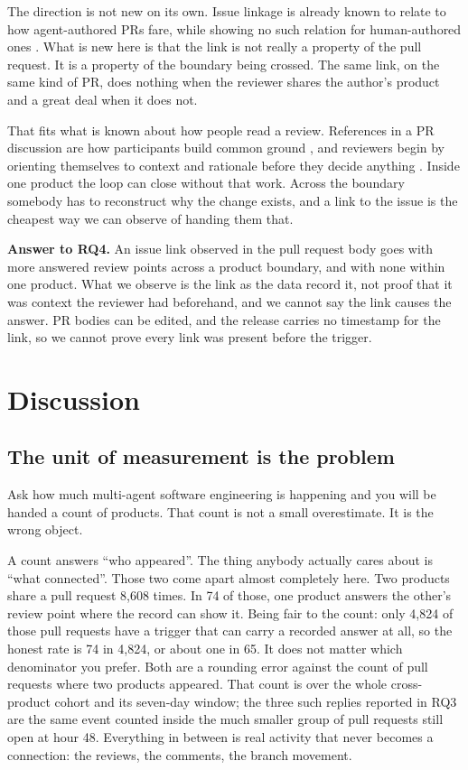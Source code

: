\documentclass[lineno,pdflatex,sn-basic]{sn-jnl}
\begin{document}
The direction is not new on its own. Issue linkage is already known to relate to
how agent-authored PRs fare, while showing no such relation for human-authored
ones \citep{yoshioka2026meaningful}. What is new here is that the link is not
really a property of the pull request. It is a property of the boundary being
crossed. The same link, on the same kind of PR, does nothing when the reviewer
shares the author's product and a great deal when it does not.

That fits what is known about how people read a review. References in a PR
discussion are how participants build common ground \citep{chopra2021referencing},
and reviewers begin by orienting themselves to context and rationale before they
decide anything \citep{heander2026decisionmaking}. Inside one product the loop
can close without that work. Across the boundary somebody has to reconstruct why
the change exists, and a link to the issue is the cheapest way we can observe of
handing them that.

\noindent\textbf{Answer to RQ4.} An issue link observed in the pull request body goes with more answered review
points across a product boundary, and with none within one product. What we
observe is the link as the data record it, not proof that it was context the
reviewer had beforehand, and we cannot say the link causes the answer. PR bodies can be edited, and the release carries no timestamp
for the link, so we cannot prove every link was present before the trigger.

\section{Discussion}\label{sec:discussion}

\subsection{The unit of measurement is the problem}

Ask how much multi-agent software engineering is happening and you will be
handed a count of products. That count is not a small overestimate. It is the
wrong object.

A count answers ``who appeared''. The thing anybody actually cares about is
``what connected''. Those two come apart almost completely here. Two products share a pull request 8,608 times. In 74 of those, one product
answers the other's review point where the record can show it. Being fair to the
count: only 4,824 of those pull requests have a trigger that can carry a recorded
answer at all, so the honest rate is 74 in 4,824, or about one in 65. It does not
matter which denominator you prefer. Both are a rounding error against the count
of pull requests where two products appeared. That count is over the whole
cross-product cohort and its seven-day window; the three such replies reported in
RQ3 are the same event counted inside the much smaller group of pull requests
still open at hour 48. Everything in between is real activity that never becomes a connection: the
reviews, the comments, the branch movement.
\end{document}
